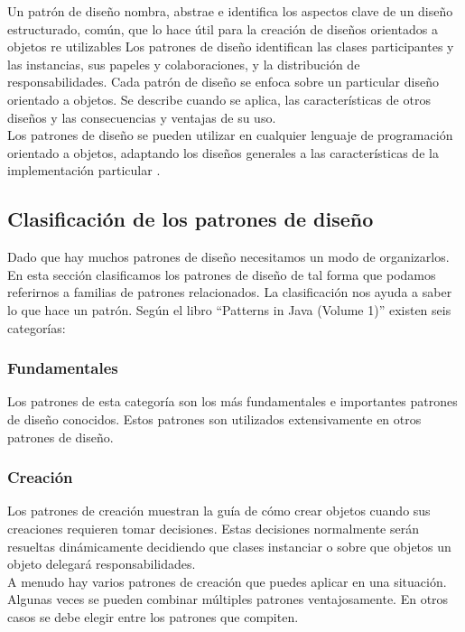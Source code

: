   Un patrón de diseño nombra, abstrae e identifica los aspectos clave de un diseño estructurado, común, que lo hace útil para la creación de diseños orientados a objetos   re utilizables Los patrones de diseño identifican las clases participantes y las instancias, sus papeles y colaboraciones, y la distribución de responsabilidades. Cada patrón de diseño se
  enfoca sobre un particular diseño orientado a objetos. Se describe cuando se aplica, las características de otros diseños y las consecuencias y ventajas de su uso. \\
  
  Los patrones de diseño se pueden utilizar en cualquier lenguaje de programación orientado a objetos, adaptando los diseños generales a las características de la implementación particular \cite{ref12}.
  
  \subsection{Clasificación de los patrones de diseño}
  Dado que hay muchos patrones de diseño necesitamos un modo de organizarlos. En esta sección clasificamos los patrones de diseño de tal forma que podamos referirnos a familias de patrones relacionados. La clasificación nos ayuda a saber lo que hace un patrón. Según el libro “Patterns in Java (Volume 1)” existen seis categorías:
  
  \subsubsection{Fundamentales}
  Los patrones de esta categoría son los más fundamentales e importantes patrones de diseño
  conocidos. Estos patrones son utilizados extensivamente en otros patrones de diseño.
  
  \subsubsection{Creación}
  Los patrones de creación muestran la guía de cómo crear objetos cuando sus creaciones requieren tomar decisiones. Estas decisiones normalmente serán resueltas dinámicamente decidiendo que clases instanciar o sobre que objetos un objeto delegará responsabilidades. \\
  
  A menudo hay varios patrones de creación que puedes aplicar en una situación. Algunas  veces se pueden combinar múltiples patrones ventajosamente. En otros casos se debe elegir  entre los patrones que compiten.
  
